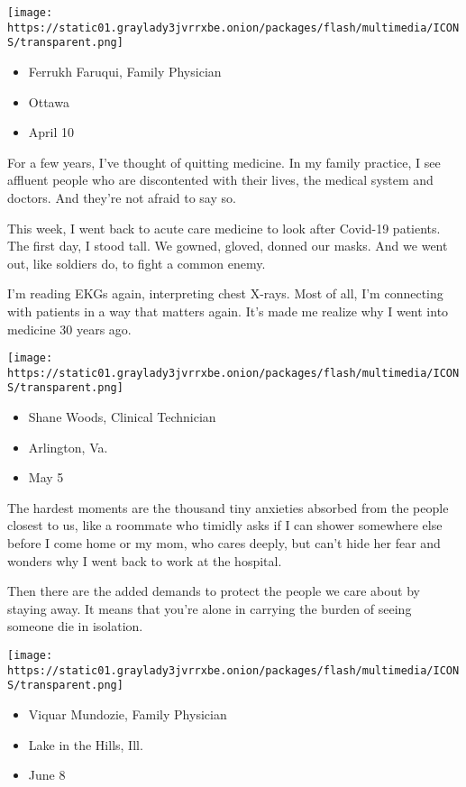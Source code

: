 \texttt{[image: https://static01.graylady3jvrrxbe.onion/packages/flash/multimedia/ICONS/transparent.png]}

\begin{itemize}
\tightlist
\item
  Ferrukh Faruqui, Family Physician
\item
  Ottawa
\item
  April 10
\end{itemize}

For a few years, I've thought of quitting medicine. In my family
practice, I see affluent people who are discontented with their lives,
the medical system and doctors. And they're not afraid to say so.

This week, I went back to acute care medicine to look after Covid-19
patients. The first day, I stood tall. We gowned, gloved, donned our
masks. And we went out, like soldiers do, to fight a common enemy.

I'm reading EKGs again, interpreting chest X-rays. Most of all, I'm
connecting with patients in a way that matters again. It's made me
realize why I went into medicine 30 years ago.

\texttt{[image: https://static01.graylady3jvrrxbe.onion/packages/flash/multimedia/ICONS/transparent.png]}

\begin{itemize}
\tightlist
\item
  Shane Woods, Clinical Technician
\item
  Arlington, Va.
\item
  May 5
\end{itemize}

The hardest moments are the thousand tiny anxieties absorbed from the
people closest to us, like a roommate who timidly asks if I can shower
somewhere else before I come home or my mom, who cares deeply, but can't
hide her fear and wonders why I went back to work at the hospital.

Then there are the added demands to protect the people we care about by
staying away. It means that you're alone in carrying the burden of
seeing someone die in isolation.

\texttt{[image: https://static01.graylady3jvrrxbe.onion/packages/flash/multimedia/ICONS/transparent.png]}

\begin{itemize}
\tightlist
\item
  Viquar Mundozie, Family Physician
\item
  Lake in the Hills, Ill.
\item
  June 8
\end{itemize}

